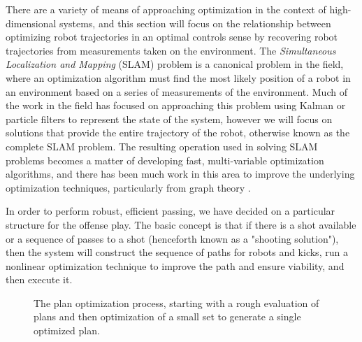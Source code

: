 There are a variety of means of approaching optimization in the context of high-dimensional systems, and this section will focus on the relationship between optimizing robot trajectories in an optimal controls sense by recovering robot trajectories from measurements taken on the environment.  The \textit{Simultaneous Localization and Mapping} (SLAM) problem is a canonical problem in the field, where an optimization algorithm must find the most likely position of a robot in an environment based on a series of measurements of the environment.  Much of the work in the field has focused on approaching this problem using Kalman or particle filters  \cite{Thrun05book,Thrun04ijrr,Dellaert03tutorial} to represent the state of the system, however we will focus on solutions that provide the entire trajectory of the robot, otherwise known as the complete SLAM problem.  The resulting operation used in solving SLAM problems becomes a matter of developing fast, multi-variable optimization algorithms, and there has been much work in this area to improve the underlying optimization techniques, particularly from graph theory \cite{Triggs99,Bertele72jmaa,Bertele72book}.  

In order to perform robust, efficient passing, we have decided on a particular structure for the offense play. The basic concept is that if there is a shot available or a sequence of passes to a shot (henceforth known as a "shooting solution"), then the system will construct the sequence of paths for robots and kicks, run a nonlinear optimization technique to improve the path and ensure viability, and then execute it.

\begin{figure}
  \centering
  \vspace {0 cm}
  \qquad
  \caption{The plan optimization process, starting with a rough evaluation of plans and then optimization of a small set to generate a single optimized plan.}
  \label{fig:planner-steps}
\end{figure} 

